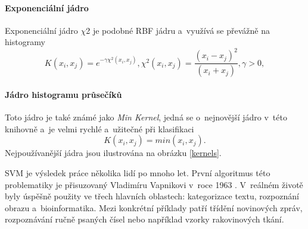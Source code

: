 \paragraph*{Exponenciální jádro} 
Exponenciální jádro $\chi$2 je podobné RBF jádru a~využívá se převážně na histogramy
\begin{equation*}
\label{expK}
 K(x_i, x_j) = e^{-\gamma \chi^2(x_i,x_j)}, \chi^2(x_i,x_j) = \frac{(x_i-x_j)^2}{(x_i+x_j)}, \gamma > 0,
\end{equation*}

\paragraph*{Jádro histogramu průsečíků} 
Toto jádro je také známé jako \textit{Min Kernel}, jedná se o~nejnovější jádro v~této knihovně a~je velmi rychlé a~užitečné při klasifikaci
\begin{equation*}
\label{innK}
 K(x_i, x_j) = min(x_i,x_j).
\end{equation*}
Nejpoužívanější jádra jsou ilustrována na obrázku \ref{kernels}.

SVM je výsledek práce několika lidí po mnoho let. První algoritmus této problematiky je přisuzovaný Vladimíru Vapnikovi v~roce 1963 \cite{svm:vapnik}. V~reálném životě byly úspěšně použity ve třech hlavních oblastech: kategorizace textu, rozpoznání obrazu a~bioinformatika. Mezi konkrétní příklady patří třídění novinových zpráv, rozpoznávání ručně psaných čísel nebo například vzorky rakovinových tkání.

